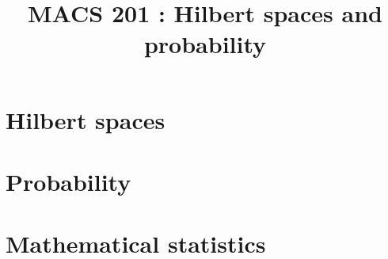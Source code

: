 \documentclass[a4paper,9pt]{article}
\title{\vspace{-1.2cm} \textbf{MACS 201 : Hilbert spaces and probability}}
\begin{document}
\maketitle

\vspace{-1.5cm}

\section{Hilbert spaces}

	

\section{Probability}

	

\section{Mathematical statistics}

	
\end{document}
